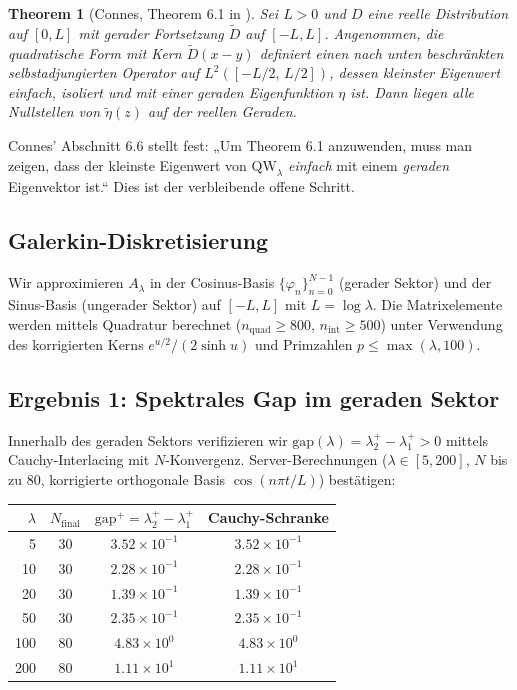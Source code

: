 \documentclass[12pt,a4paper]{article}
\newtheorem{theorem}{Theorem}[section]
\theoremstyle{definition}
\theoremstyle{remark}
\begin{document}
\begin{theorem}[Connes, Theorem 6.1 in \cite{Connes2025}]
Sei $L > 0$ und $D$ eine reelle Distribution auf $[0,L]$ mit gerader Fortsetzung $\tilde{D}$ auf $[-L,L]$. Angenommen, die quadratische Form mit Kern $\tilde{D}(x-y)$ definiert einen nach unten beschränkten selbstadjungierten Operator auf $L^2([-L/2,\,L/2])$, dessen kleinster Eigenwert einfach, isoliert und mit einer geraden Eigenfunktion $\eta$ ist. Dann liegen alle Nullstellen von $\tilde{\eta}(z)$ auf der reellen Geraden.
\end{theorem}

\noindent Connes' Abschnitt 6.6 stellt fest: „Um Theorem 6.1 anzuwenden, muss man zeigen, dass der kleinste Eigenwert von $\mathrm{QW}_\lambda$ \emph{einfach} mit einem \emph{geraden} Eigenvektor ist.“ Dies ist der verbleibende offene Schritt.

\subsection{Galerkin-Diskretisierung}

Wir approximieren $A_\lambda$ in der Cosinus-Basis $\{\varphi_n\}_{n=0}^{N-1}$ (gerader Sektor) und der Sinus-Basis (ungerader Sektor) auf $[-L,L]$ mit $L = \log\lambda$. Die Matrixelemente werden mittels Quadratur berechnet ($n_{\mathrm{quad}} \geq 800$, $n_{\mathrm{int}} \geq 500$) unter Verwendung des korrigierten Kerns $e^{u/2}/(2\sinh u)$ und Primzahlen $p \leq \max(\lambda, 100)$.

\subsection{Ergebnis 1: Spektrales Gap im geraden Sektor}

Innerhalb des geraden Sektors verifizieren wir $\mathrm{gap}(\lambda) = \lambda_2^+ - \lambda_1^+ > 0$ mittels Cauchy-Interlacing mit $N$-Konvergenz. Server-Berechnungen ($\lambda \in [5,200]$, $N$ bis zu 80, korrigierte orthogonale Basis $\cos(n\pi t/L)$) bestätigen:

\medskip
\begin{center}
\renewcommand{\arraystretch}{1.2}
\begin{tabular}{r|c|c|c}
$\lambda$ & $N_{\mathrm{final}}$ & $\mathrm{gap}^+ = \lambda_2^+ - \lambda_1^+$ & Cauchy-Schranke \\\hline
5 & 30 & $3.52\times 10^{-1}$ & $3.52\times 10^{-1}$ \\
10 & 30 & $2.28\times 10^{-1}$ & $2.28\times 10^{-1}$ \\
20 & 30 & $1.39\times 10^{-1}$ & $1.39\times 10^{-1}$ \\
50 & 30 & $2.35\times 10^{-1}$ & $2.35\times 10^{-1}$ \\
100 & 80 & $4.83\times 10^{0}$ & $4.83\times 10^{0}$ \\
200 & 80 & $1.11\times 10^{1}$ & $1.11\times 10^{1}$ \\
\end{tabular}
\end{center}
\end{document}
